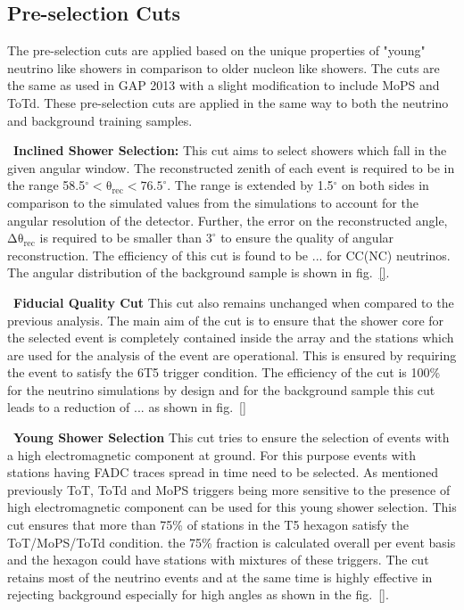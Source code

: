 \subsection{Pre-selection Cuts}
\label{subsec:nu_sel_preselcut}

The pre-selection cuts are applied based on the unique properties of "young" neutrino like showers in comparison to older nucleon like showers. The cuts are the same as used in GAP 2013 with a slight modification to include MoPS and ToTd. These pre-selection cuts are applied in the same way to both the neutrino and background training samples. 
\begin{description}
  \item ~\textbf{Inclined Shower Selection:} This cut aims to select showers which fall in the given angular window. The reconstructed zenith of each event is required to be in the range 58.5$^{\circ} < \mathrm{\theta_{rec} < 76.5^{\circ}}$. The range is extended by 1.5$^\circ$ on both sides in comparison to the simulated values from the simulations to account for the angular resolution of the detector. Further, the error on the reconstructed angle, $\mathrm{\Delta \theta_{rec}}$ is required to be smaller than $3^\circ$ to ensure the quality of angular reconstruction. The efficiency of this cut is found to be ... for CC(NC) neutrinos. The angular distribution of the background sample is shown in fig.~\ref{}.
  \item ~\textbf{Fiducial Quality Cut} This cut also remains unchanged when compared to the previous analysis. The main aim of the cut is to ensure that the shower core for the selected event is completely contained inside the array and the stations which are used for the analysis of the event are operational. This is ensured by requiring the event to satisfy the 6T5 trigger condition. The efficiency of the cut is 100\% for the neutrino simulations by design and for the background sample this cut leads to a reduction of ... as shown in fig.~\ref{}   
  \item ~\textbf{Young Shower Selection} This cut tries to ensure the selection of events with a high electromagnetic component at ground. For this purpose events with stations having FADC traces spread in time need to be selected. As mentioned previously ToT, ToTd and MoPS triggers being more sensitive to the presence of high electromagnetic component can be used for this young shower selection. This cut ensures that more than 75\% of stations in the T5 hexagon satisfy the ToT/MoPS/ToTd condition. the 75\% fraction is calculated overall per event basis and the hexagon could have stations with mixtures of these triggers. The cut retains most of the neutrino events and at the same time is highly effective in rejecting background especially for high angles as shown in the fig.~\ref{}.

\end{description}
